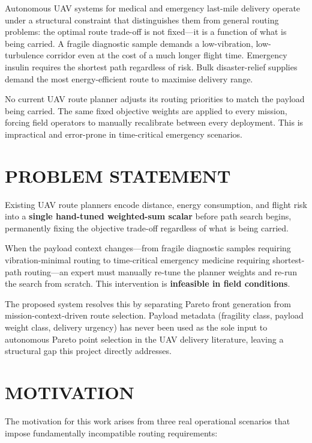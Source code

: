 Autonomous UAV systems for medical and emergency last-mile delivery operate under a
structural constraint that distinguishes them from general routing problems: the optimal
route trade-off is not fixed---it is a function of what is being carried. A fragile
diagnostic sample demands a low-vibration, low-turbulence corridor even at the cost of
a much longer flight time. Emergency insulin requires the shortest path regardless of
risk. Bulk disaster-relief supplies demand the most energy-efficient route to maximise
delivery range.

No current UAV route planner adjusts its routing priorities to match the payload being
carried. The same fixed objective weights are applied to every mission, forcing field
operators to manually recalibrate between every deployment. This is impractical and
error-prone in time-critical emergency scenarios.

\section{PROBLEM STATEMENT}

Existing UAV route planners encode distance, energy consumption, and flight risk into a
\textbf{single hand-tuned weighted-sum scalar} before path search begins, permanently
fixing the objective trade-off regardless of what is being carried.

When the payload context changes---from fragile diagnostic samples requiring
vibration-minimal routing to time-critical emergency medicine requiring shortest-path
routing---an expert must manually re-tune the planner weights and re-run the search from
scratch. This intervention is \textbf{infeasible in field conditions}.

The proposed system resolves this by separating Pareto front generation from
mission-context-driven route selection. Payload metadata (fragility class, payload
weight class, delivery urgency) has never been used as the sole input to autonomous Pareto
point selection in the UAV delivery literature, leaving a structural gap this project
directly addresses.

\section{MOTIVATION}

The motivation for this work arises from three real operational scenarios that impose
fundamentally incompatible routing requirements:

